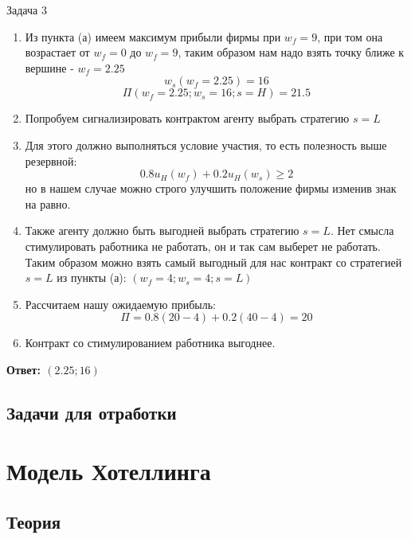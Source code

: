 \begin{mybox}{Задача 3}
\begin{enumerate}
$$\begin{gathered}
          \end{gathered}
        \right.$$
        $$\sqrt{w_f}\leq1.5$$
        $$\begin{cases}
            w_f\leq2.25 \\
            w_f\geq0 \\
        \end{cases}$$
        \item Из пункта (а) имеем максимум прибыли фирмы при $w_f=9$, при том она возрастает от $w_f=0$ до $w_f=9$,
        таким образом нам надо взять точку ближе к вершине - $w_f=2.25$
        $$w_s(w_f=2.25)=16$$
        $$\Pi(w_f=2.25;w_s=16;s=H)=21.5$$
        \item Попробуем сигнализировать контрактом агенту выбрать стратегию $s=L$
        \item Для этого должно выполняться условие участия, то есть полезность выше резервной: $$0.8u_H(w_f)+0.2u_H(
        w_s)\geq2$$ но в нашем случае можно строго улучшить положение фирмы изменив знак на равно.
        \item Также агенту должно быть выгодней выбрать стратегию $s=L$. Нет смысла стимулировать работника
        не работать, он и так сам выберет не работать. Таким
        образом можно взять самый выгодный для нас контракт со стратегией $s=L$ из пункты (а): $(w_f=4; w_s=4; s=L)$
        \item Рассчитаем нашу ожидаемую прибыль: $$\Pi=0.8(20-4)+0.2(40-4)=20$$
        \item Контракт со стимулированием работника выгоднее.
    \end{enumerate}
    \textbf{Ответ: $(2.25;16)$}
\end{mybox}

\section{Задачи для отработки}

\chapter{Модель Хотеллинга}
\section{Теория}


